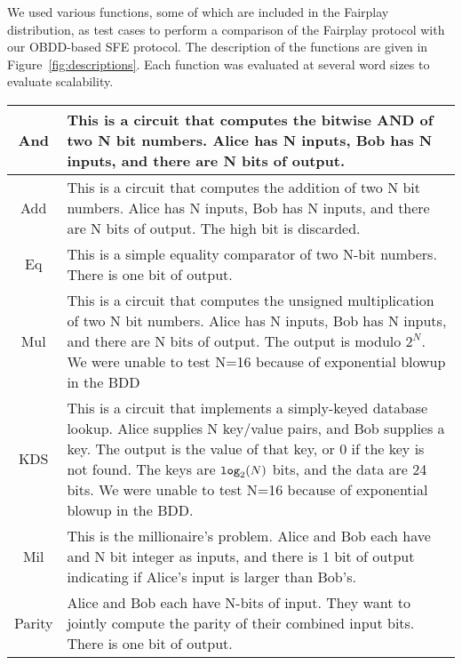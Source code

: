 We used various functions, some of which are included in the Fairplay
distribution, as test
cases to perform a comparison of the Fairplay protocol with our
OBDD-based SFE protocol. The description of the functions are given
in Figure~\ref{fig:descriptions}.  Each function was evaluated
at several word sizes to evaluate scalability.

\begin{figure*}
\begin{tabular}{|c|p{6in}|}
\hline 
And&
This is a circuit that computes the bitwise AND of two N bit numbers.
Alice has N inputs, Bob has N inputs, and there are N bits of output.\tabularnewline
\hline 
Add&
This is a circuit that computes the addition of two N bit numbers.
Alice has N inputs, Bob has N inputs, and there are N bits of output.
The high bit is discarded.\tabularnewline
\hline 
Eq&
This is a simple equality comparator of two N-bit numbers.  There is
one bit of output. \tabularnewline
\hline
Mul&
This is a circuit that computes the unsigned multiplication of two
N bit numbers. Alice has N inputs, Bob has N inputs, and there are
N bits of output. The output is modulo $2^N$.  
We were unable to test N=16 because of exponential blowup in the BDD
\tabularnewline
\hline 
KDS&
This is a circuit that implements a simply-keyed database lookup.
Alice supplies N key/value pairs, and Bob supplies a key. The output
is the value of that key, or 0 if the key is not found. The keys are
${\tt log}_2(N)$ bits, and the data are 24 bits. 
We were unable to test N=16 because of exponential blowup in the BDD.
\tabularnewline
\hline 
Mil&
This is the millionaire's problem. Alice and Bob each have and N bit integer
as inputs, and there is 1 bit of output indicating if Alice's input is larger than Bob's.\tabularnewline
\hline 
Parity&
Alice and Bob each have N-bits of input. They want to jointly compute the
parity of their combined input bits.  There is one bit of output.\tabularnewline
\hline
\end{tabular}
\caption{Description of the functions used in our experiments.  Each function
was tested with N=4, N=8, and N=16 except where indicated}
\label{fig:descriptions}
\end{figure*}


